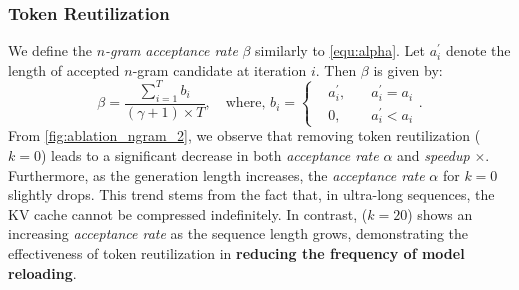 \subsubsection{Token Reutilization}
We define the \emph{$n$-gram acceptance rate} $\beta$ similarly to \cref{equ:alpha}. Let $a_i^{\prime}$ denote the length of accepted $n$-gram candidate at iteration $i$. Then $\beta$ is given by:
\vspace{-0.1 in}
\begin{equation} 
\label{equ:beta} 
\beta = \frac{\sum_{i=1}^T b_i}{(\gamma+1) \times T},\quad \text{where,~}b_i = \left\{\begin{aligned}
&  a_i^{\prime}, \quad  &a_i^{\prime} = a_i\\
&  0, \quad  &a_i^{\prime} < a_i
\end{aligned}\right.. 
\end{equation}
From \cref{fig:ablation_ngram_2}, we observe that removing token reutilization ($k=0$) leads to a significant decrease in both \emph{acceptance rate} $\alpha$ and \emph{speedup} $\times$. Furthermore, as the generation length increases, the \emph{acceptance rate} $\alpha$ for $k=0$ slightly drops. This trend stems from the fact that, in ultra-long sequences, the KV cache cannot be compressed indefinitely. In contrast, \ours ($k=20$) shows an increasing \emph{acceptance rate} as the sequence length grows, demonstrating the effectiveness of token reutilization in \textbf{reducing the frequency of model reloading}.




\begin{table}[ht!]
    \centering
\begin{minipage}{.48\textwidth}

\end{minipage}\hfill
\begin{minipage}{.48\textwidth}

\end{minipage}
\end{table}



